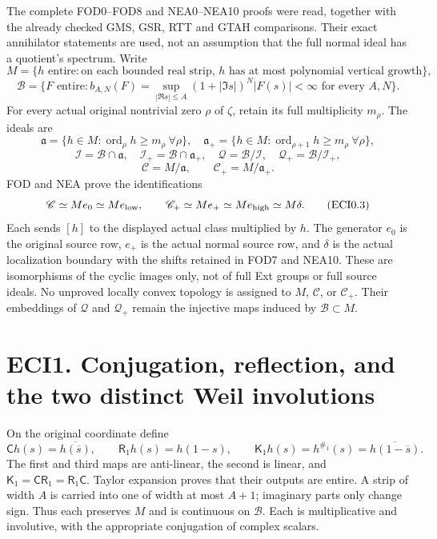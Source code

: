 The complete FOD0--FOD8 and NEA0--NEA10 proofs were read, together with
the already checked GMS, GSR, RTT and GTAH comparisons. Their exact
annihilator statements are used, not an assumption that the full normal
ideal has a quotient's spectrum. Write \[
M=\{h\text{ entire}:\text{on each bounded real strip, }h
\text{ has at most polynomial vertical growth}\},
\] \[
\mathcal B=\{F\text{ entire}:b_{A,N}(F)=
\sup_{|\Re s|\le A}(1+|\Im s|)^N|F(s)|<\infty
\text{ for every }A,N\}.
\tag{ECI0.1}
\] For every actual original nontrivial zero \(\rho\) of \(\zeta\),
retain its full multiplicity \(m_\rho\). The ideals are \[
\mathfrak a=\{h\in M:\operatorname{ord}_\rho h\ge m_\rho\ \forall\rho\},
\quad
\mathfrak a_+=\{h\in M:\operatorname{ord}_{\rho+1}h\ge m_\rho\ \forall\rho\},
\] \[
\mathcal I=\mathcal B\cap\mathfrak a,
\quad\mathcal I_+=\mathcal B\cap\mathfrak a_+,
\quad\mathcal Q=\mathcal B/\mathcal I,
\quad\mathcal Q_+=\mathcal B/\mathcal I_+,
\] \[
\mathscr C=M/\mathfrak a,
\qquad\mathscr C_+=M/\mathfrak a_+.
\tag{ECI0.2}
\] FOD and NEA prove the identifications \[
\mathscr C\simeq M e_0\simeq M e_{\rm low},\qquad
\mathscr C_+\simeq M e_+\simeq M e_{\rm high}\simeq M\delta.
\tag{ECI0.3}
\] Each sends \([h]\) to the displayed actual class multiplied by \(h\).
The generator \(e_0\) is the original source row, \(e_+\) is the actual
normal source row, and \(\delta\) is the actual localization boundary
with the shifts retained in FOD7 and NEA10. These are isomorphisms of
the cyclic images only, not of full Ext groups or full source ideals. No
unproved locally convex topology is assigned to \(M\), \(\mathscr C\),
or \(\mathscr C_+\). Their embeddings of \(\mathcal Q\) and
\(\mathcal Q_+\) remain the injective maps induced by
\(\mathcal B\subset M\).

\section{ECI1. Conjugation, reflection, and the two distinct Weil
involutions}\label{eci1.-conjugation-reflection-and-the-two-distinct-weil-involutions}

On the original coordinate define \[
\mathsf C h(s)=\overline{h(\overline s)},\qquad
\mathsf R_1h(s)=h(1-s),\qquad
\mathsf K_1h(s)=h^{\#_1}(s)=\overline{h(1-\overline s)}.
\tag{ECI1.1}
\] The first and third maps are anti-linear, the second is linear, and
\(\mathsf K_1=\mathsf C\mathsf R_1=\mathsf R_1\mathsf C\). Taylor
expansion proves that their outputs are entire. A strip of width \(A\)
is carried into one of width at most \(A+1\); imaginary parts only
change sign. Thus each preserves \(M\) and is continuous on
\(\mathcal B\). Each is multiplicative and involutive, with the
appropriate conjugation of complex scalars.

